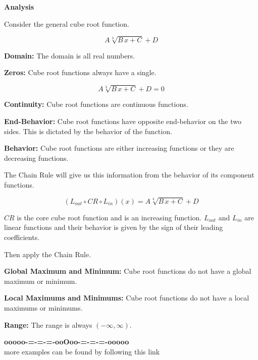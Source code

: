 \documentclass{ximera}
\begin{document}
\begin{summary} \textbf{\textcolor{red!70!yellow}{Analysis}}


Consider the general cube root function.

\[  A \sqrt[3]{B \,x + C} + D  \]


\textbf{Domain:} The domain is all real numbers.


\textbf{Zeros:} Cube root functions always have a single.


\[  A \sqrt[3]{B \,x + C} + D  = 0 \]




\textbf{Continuity:} Cube root functions are continuous functions.   



\textbf{End-Behavior:} Cube root functions have opposite end-behavior on the two sides.  This is dictated by the behavior of the function.



\textbf{Behavior:} Cube root functions are either increasing functions or they are decreasing functions.  

The Chain Rule will give us this information from the behavior of its component functions.


\[
(L_{out} \circ CR \circ L_{in})(x) = A \sqrt[3]{B \,x + C} + D
\]


$CR$ is the core cube root function and is an increasing function.  $L_{out}$ and $L_{in}$ are linear functions and their behavior is given by the sign of their leading coefficients.

Then apply the Chain Rule.



\textbf{Global Maximum and Minimum:}  Cube root functions do not have a global maximum or minimum.


\textbf{Local Maximums and Minimums:} Cube root functions do not have a local maximums or minimums.


\textbf{Range:} The range is always $(-\infty, \infty)$.

\end{summary}




































\begin{center}
\textbf{\textcolor{green!50!black}{ooooo-=-=-=-ooOoo-=-=-=-ooooo}} \\

more examples can be found by following this link\\ 

\end{center}
\end{document}
